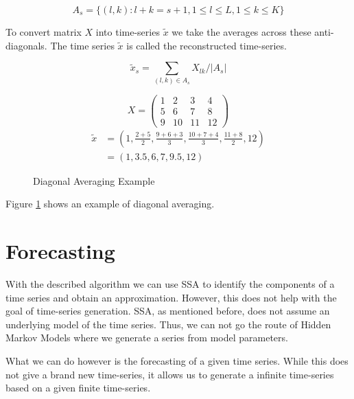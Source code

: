 \begin{equation}
A_{s}=\{(l, k): l+k=s+1,1 \leq l \leq L, 1 \leq k \leq K\}
\end{equation}

To convert matrix $X$ into time-series $\tilde{x}$ we take the averages across these anti-diagonals. The time series $\tilde{x}$ is called the reconstructed time-series. 

\begin{equation}
    \widetilde{x}_{s}=\sum_{(l, k) \in A_{s}} X_{l k} /\left|A_{s}\right|
\end{equation}


\begin{figure}
   \begin{equation*}
      X = 
      \begin{pmatrix}
         1 & 2 & 3 & 4 \\
         5 & 6 & 7 & 8 \\
         9 & 10 & 11 & 12
      \end{pmatrix}
   \end{equation*}
   \begin{equation*}
      \begin{aligned}
      \widetilde{x} &= (1, \frac{2+5}{2}, \frac{9 + 6 + 3}{3}, \frac{10 + 7 + 4}{3}, \frac{11 + 8}{2}, 12) \\
      &= (1, 3.5, 6, 7, 9.5, 12)
      \end{aligned}
   \end{equation*}
\caption{Diagonal Averaging Example}
\label{fig:diagonal-averaging}
\end{figure}

Figure \ref{fig:diagonal-averaging} shows an example of diagonal averaging. 

\section{Forecasting}

With the described algorithm we can use SSA to identify the components of a time series and obtain an approximation. However, this does not help with the goal of time-series generation. SSA, as mentioned before, does not assume an underlying model of the time series. Thus, we can not go the route of Hidden Markov Models where we generate a series from model parameters. 

What we can do however is the forecasting of a given time series. While this does not give a brand new time-series, it allows us to generate a infinite time-series based on a given finite time-series.

